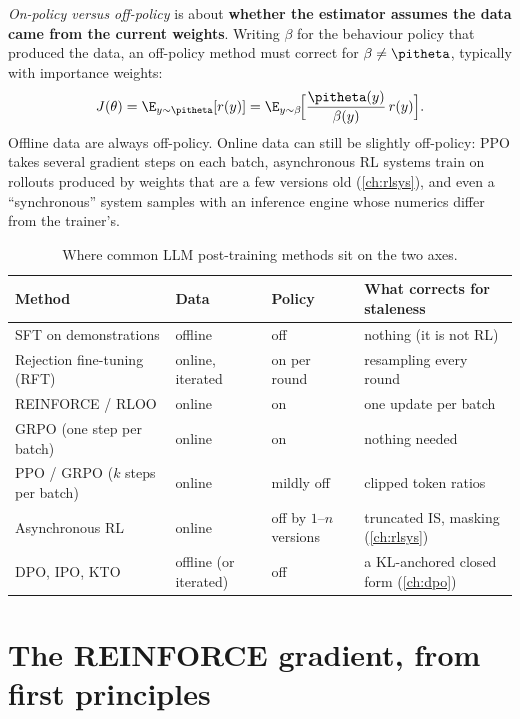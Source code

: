 \emph{On-policy versus off-policy} is about \textbf{whether the estimator assumes the data
came from the current weights}. Writing $\beta$ for the behaviour policy that produced the
data, an off-policy method must correct for $\beta\ne\pitheta$, typically with importance
weights:
\begin{equation}
J(\theta)=\E_{y\sim\pitheta}[r(y)]=\E_{y\sim\beta}\!\Big[\frac{\pitheta(y)}{\beta(y)}\,r(y)\Big].
\label{eq:pg:is}
\end{equation}
Offline data are always off-policy. Online data can still be slightly off-policy: PPO takes
several gradient steps on each batch, asynchronous RL systems train on rollouts produced by
weights that are a few versions old (\cref{ch:rlsys}), and even a ``synchronous'' system
samples with an inference engine whose numerics differ from the trainer's.

\begin{table}[ht]
\centering\small
\begin{tabularx}{\linewidth}{@{}lllX@{}}
\toprule
Method & Data & Policy & What corrects for staleness\\
\midrule
SFT on demonstrations & offline & off & nothing (it is not RL)\\
Rejection fine-tuning (RFT) & online, iterated & on per round & resampling every round\\
REINFORCE / RLOO & online & on & one update per batch\\
GRPO (one step per batch) & online & on & nothing needed\\
PPO / GRPO ($k$ steps per batch) & online & mildly off & clipped token ratios\\
Asynchronous RL & online & off by $1$--$n$ versions & truncated IS, masking (\cref{ch:rlsys})\\
DPO, IPO, KTO & offline (or iterated) & off & a KL-anchored closed form (\cref{ch:dpo})\\
\bottomrule
\end{tabularx}
\caption{Where common LLM post-training methods sit on the two axes.}
\label{tab:pg:onoff}
\end{table}

\section{The REINFORCE gradient, from first principles}\label{sec:pg:reinforce}

